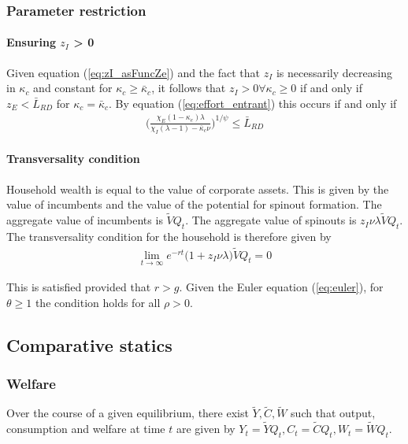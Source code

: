 \documentclass[12pt,english]{article}
\theoremstyle{remark}
\begin{document}
\subsubsection{Parameter restriction}

\paragraph{Ensuring $z_I$ > 0}
Given equation (\ref{eq:zI_asFuncZe}) and the fact that $z_I$ is necessarily decreasing in $\kappa_c$ and constant for $\kappa_c \ge \bar{\kappa}_c$, it follows that $z_I > 0 \forall \kappa_c \ge 0$ if and only if $z_E < \bar{L}_{RD}$ for $\kappa_c = \bar{\kappa}_c$. By equation (\ref{eq:effort_entrant}) this occurs if and only if
\begin{align}
	\Big( \frac{\chi_E (1-\kappa_{e}) \lambda}{\chi_I(\lambda-1) - \bar{\kappa}_c \nu } \Big)^{1/\psi} \le \bar{L}_{RD}
\end{align}

\paragraph{Transversality condition}

Household wealth is equal to the value of corporate assets. This is given by the value of incumbents and the value of the potential for spinout formation. The aggregate value of incumbents is $\tilde{V}Q_t$. The aggregate value of spinouts is $z_I \nu \lambda \tilde{V} Q_t$. The transversality condition for the household is therefore given by 
\begin{align}
	\lim_{t \to \infty} e^{-rt} \big(1 + z_I \nu \lambda \big)\tilde{V} Q_t = 0
\end{align}

This is satisfied provided that $r > g$. Given the Euler equation (\ref{eq:euler}), for $\theta \ge 1$ the condition holds for all $\rho > 0$. 

\subsection{Comparative statics}

\subsubsection{Welfare}

Over the course of a given equilibrium, there exist $\tilde{Y},\tilde{C},\tilde{W}$ such that output, consumption and welfare at time $t$ are given by $Y_t = \tilde{Y} Q_t, C_t = \tilde{C} Q_t, W_t = \tilde{W} Q_t$. 
\end{document}
